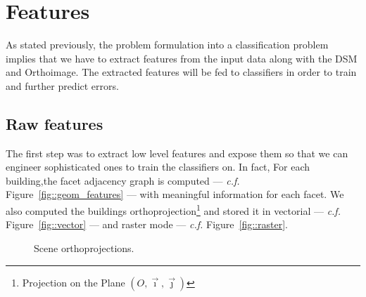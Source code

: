 \documentclass[../main.tex]{subfiles}
\begin{document}
	\section{Features}

	As stated previously, the problem formulation into a classification problem implies that we have to extract features from the input data along with the DSM and Orthoimage. The extracted features will be fed to classifiers in order to train and further predict errors.\\

	\subsection{Raw features}


	The first step was to extract low level features and expose them so that we can engineer sophisticated ones to train the classifiers on. In fact, For each building,the facet adjacency graph is computed --- \textit{c.f.} Figure~\ref{fig::geom_features} --- with meaningful information for each facet. We also computed the buildings orthoprojection\footnote{Projection on the Plane $(O, \vec{\imath}, \vec{\jmath})$} and stored it in vectorial --- \textit{c.f.} Figure~\ref{fig::vector} --- and raster mode --- \textit{c.f.} Figure~\ref{fig::raster}.\\

	\begin{figure}[H]
		{
			\caption{\label{fig::orthoproj}Scene orthoprojections.}
		}
	\end{figure}
\end{document}
